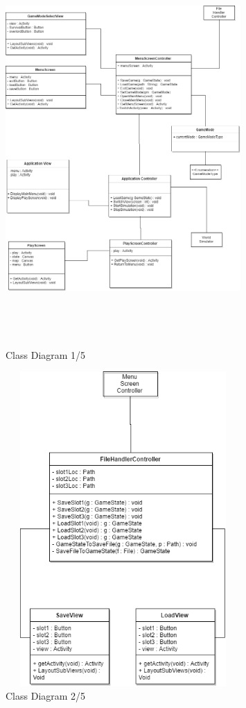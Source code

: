 \documentclass[]{article}
\begin{document}
\begin{figure}[h]
    \centering
    \includegraphics[width=0.8\textwidth , height=15cm, keepaspectratio]{dcdTL}
    \caption{Class Diagram 1/5}
    \label{fig:dcdTL}
\end{figure}

\pagebreak
\begin{figure}[h]
    \centering
    \includegraphics[width=0.8\textwidth , height=12cm, keepaspectratio]{dcdF}
    \caption{Class Diagram 2/5}
    \label{fig:dcdTL}
\end{figure}
\end{document}
